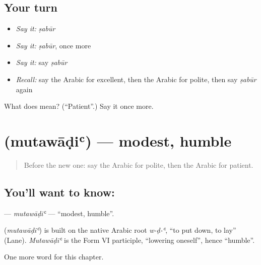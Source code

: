 \subsection*{Your turn}
\begin{itemize}
\raggedright
  \item \emph{Say it:} \emph{ṣabūr}
  \item \emph{Say it:} \emph{ṣabūr}, once more
  \item \emph{Say it:} say \emph{ṣabūr}
  \item \emph{Recall:} say the Arabic for excellent, then the Arabic for polite, then say \emph{ṣabūr} again
\end{itemize}

\begin{tcolorbox}[breakable,colback=teal!4,colframe=teal!35!black,title={Before you move on}]
What does  mean? (\textquotedblleft{}Patient\textquotedblright{}.) Say it once more.
\end{tcolorbox}
\section[\texorpdfstring{\ar{متواضع} (mutawāḍiʿ)}{متواضع (mutawāḍiʿ)}]{ (mutawāḍiʿ) — modest, humble}

\label{lesson:AR-C241-mutawadi}



\begin{quote}
Before the new one: say the Arabic for polite, then the Arabic for patient.
\end{quote}

\subsection*{You'll want to know: }
\textbf{} — \emph{mutawāḍiʿ} — \textquotedblleft{}modest, humble\textquotedblright{}.

\begin{cousinweb}
\textbf{} (\emph{mutawāḍiʿ}) is built on the native Arabic root \emph{w-ḍ-ʿ}, \textquotedblleft{}to put down, to lay\textquotedblright{} (Lane). \emph{Mutawāḍiʿ} is the Form VI participle, \textquotedblleft{}lowering oneself\textquotedblright{}, hence \textquotedblleft{}humble\textquotedblright{}.
\end{cousinweb}

\begin{grammarlens}[title={What you've built}]
One more word for this chapter.
\end{grammarlens}


